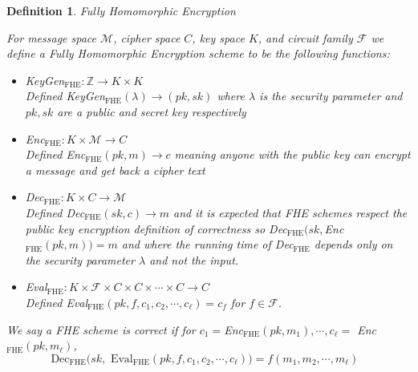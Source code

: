 \documentclass[12pt,twoside]{reedthesis}
\newtheorem{definition}{Definition}
\newcommand{\dec}[0]{\text{Dec}}
\newcommand{\Z}[0]{\mathbb{Z}}
\begin{document}
    \begin{definition}{Fully Homomorphic Encryption}
    \par For message space $\mathcal{M}$, cipher space $C$, key space $K$, and circuit family $\mathcal{F}$ we define a Fully Homomorphic Encryption scheme to be the following functions:
     
     \newcommand{\fhe}[0]{_\text{FHE}}
     
     \begin{itemize}
     \item KeyGen$_\text{FHE}:\Z \to K \times K$ \\
     Defined KeyGen$_\text{FHE}(\lambda)\to (pk,sk)$ where $\lambda$ is the security parameter and $pk,sk$ are a public and secret key respectively 
     \item Enc$_\text{FHE}:K \times \mathcal{M}\to C$ \\
     Defined Enc$_\text{FHE}(pk,m) \to c$ meaning anyone with the public key can encrypt a message and get back a cipher text
     \item Dec$_\text{FHE}:K \times C \to \mathcal{M}$ \\
     Defined Dec$_\text{FHE}(sk,c) \to m$ and it is expected that FHE schemes respect the public key encryption definition of correctness so Dec$_\text{FHE}(sk,$Enc$_\text{FHE}(pk,m))=m$ and where the running time of Dec$_\text{FHE}$ depends only on the security parameter $\lambda$ and not the input.
     \item Eval$_\text{FHE}:K \times \mathcal{F} \times C \times C \times \cdots \times C \to C$ \\
     Defined Eval$\fhe(pk,f,c_1,c_2,\cdots,c_\ell) = c_f$ for $f\in \mathcal{F}$.
    \end{itemize}
    \par We say a FHE scheme is correct if for $c_1 =$Enc$\fhe(pk,m_1), \cdots, c_\ell =$ Enc$\fhe(pk,m_\ell)$,
    $$\text{$\dec_\text{FHE}(sk,$ Eval$\fhe(pk,f,c_1,c_2, \cdots, c_\ell)) = f(m_1,m_2,\cdots,m_\ell)$ }$$ 
    \end{definition}
    
\end{document}
